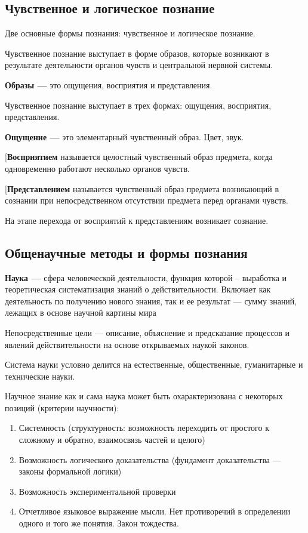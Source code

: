 \documentclass[a4paper, 14pt]{extreport}
\begin{document}
\subsection{Чувственное и логическое познание}

Две основные формы познания: чувственное и логическое познание.

Чувственное познание выступает в форме образов, которые возникают в
результате деятельности органов чувств и центральной нервной системы.

\textbf{Образы ---}
это ощущения, восприятия и представления.


Чувственное познание выступает в трех формах: ощущения, восприятия,
представления.

\textbf{Ощущение ---}
это элементарный чувственный образ. Цвет, звук.
\item[\textbf{Восприятием}
называется целостный чувственный образ предмета, когда одновременно
работают несколько органов чувств.
\item[\textbf{Представлением}
называется чувственный образ предмета возникающий в сознании при
непосредственном отсутствии предмета перед органами чувств.


На этапе перехода от восприятий к представлениям возникает сознание.

\subsection{Общенаучные методы и формы познания}

\textbf{Наука ---}
сфера человеческой деятельности, функция которой -- выработка и
теоретическая систематизация знаний о действительности. Включает как
деятельность по получению нового знания, так и ее результат --- сумму
знаний, лежащих в основе научной картины мира


Непосредственные цели --- описание, объяснение и предсказание процессов
и явлений действительности на основе открываемых наукой законов.

Система науки условно делится на естественные, общественные,
гуманитарные и технические науки.

Научное знание как и сама наука может быть охарактеризована с некоторых
позиций (критерии научности):

\begin{enumerate}
\def\labelenumi{\arabic{enumi}.}
\item
  Системность (структурность: возможность переходить от простого к
  сложному и обратно, взаимосвязь частей и целого)
\item
  Возможность логического доказательства (фундамент доказательства ---
  законы формальной логики)
\item
  Возможность экспериментальной проверки
\item
  Отчетливое языковое выражение мысли. Нет противоречий в определении
  одного и того же понятия. Закон тождества.
\end{enumerate}
\end{document}
